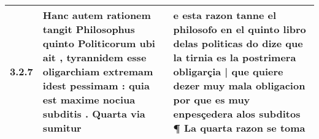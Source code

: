 \begin{tabular}{|p{1cm}|p{6.5cm}|p{6.5cm}|}

\hline
3.2.7 & Hanc autem rationem tangit Philosophus quinto Politicorum ubi ait , \textbf{ tyrannidem esse oligarchiam extremam idest pessimam : } quia est maxime nociua subditis . Quarta via sumitur & e esta razon tanne el philosofo en el quinto libro delas politicas do dize \textbf{ que la tirnia es la postrimera obligarçia | que quiere dezer muy mala obligacion } por que es muy enpesçedera alos subditos ¶ La quarta razon se toma \\\hline

\end{tabular}
